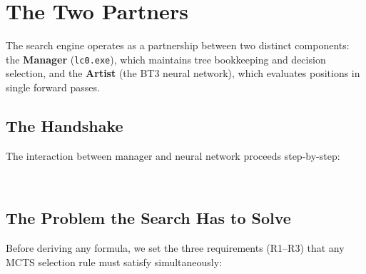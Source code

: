 \chapter{The Two Partners}
\label{ch:partners}

The search engine operates as a partnership between two distinct components: the \textbf{Manager} (\texttt{lc0.exe}), which maintains tree bookkeeping and decision selection, and the \textbf{Artist} (the BT3 neural network), which evaluates positions in single forward passes.

\section{The Handshake}

\begin{established}
The interaction between manager and neural network proceeds step-by-step:
\begin{center}
\begin{minipage}{\linewidth}
\captionsetup{type=figure}
\centering
{}\qquad
{}\\[2ex]
\qquad
{}
\label{fig:1_1}
\end{minipage}
\end{center}
\end{established}

\section{The Problem the Search Has to Solve}
\label{sec:1_2}


\begin{established}
Before deriving any formula, we set the three requirements (R1--R3) that any MCTS selection rule must satisfy simultaneously:
\begin{center}

\label{fig:1_7}
\end{center}
\end{established}

